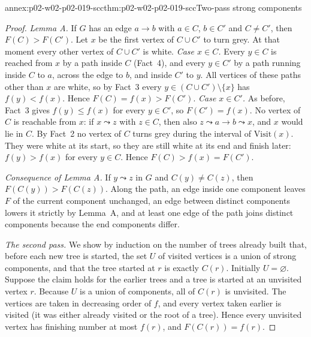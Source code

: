 \begin{annexitem}{annex:p02-w02-p02-019-scc}{thm:p02-w02-p02-019-scc}{Two-pass strong components}
\begin{proof}
\emph{Lemma A.}  If \(G\) has an edge \(a\to b\) with \(a\in C\),
\(b\in C'\) and \(C\neq C'\), then \(F(C)>F(C')\).  Let \(x\) be the first
vertex of \(C\cup C'\) to turn grey.  At that moment every other vertex of
\(C\cup C'\) is white.
\emph{Case \(x\in C\).}  Every \(y\in C\) is reached from \(x\) by a path
inside \(C\) (Fact~4), and every \(y\in C'\) by a path running inside \(C\) to
\(a\), across the edge to \(b\), and inside \(C'\) to \(y\).  All vertices of
these paths other than \(x\) are white, so by Fact~3 every
\(y\in(C\cup C')\setminus\{x\}\) has \(f(y)<f(x)\).  Hence
\(F(C)=f(x)>F(C')\).
\emph{Case \(x\in C'\).}  As before, Fact~3 gives \(f(y)\leq f(x)\) for every
\(y\in C'\), so \(F(C')=f(x)\).  No vertex of \(C\) is reachable from \(x\):
if \(x\leadsto z\) with \(z\in C\), then also \(z\leadsto a\to b\leadsto x\),
and \(x\) would lie in \(C\).  By Fact~2 no vertex of \(C\) turns grey during
the interval of \(\mathrm{Visit}(x)\).  They were white at its start, so they
are still white at its end and finish later: \(f(y)>f(x)\) for every
\(y\in C\).  Hence \(F(C)>f(x)=F(C')\).

\emph{Consequence of Lemma A.}  If \(y\leadsto z\) in \(G\) and
\(C(y)\neq C(z)\), then \(F(C(y))>F(C(z))\).  Along the path, an edge inside
one component leaves \(F\) of the current component unchanged, an edge between
distinct components lowers it strictly by Lemma~A, and at least one edge of the
path joins distinct components because the end components differ.

\emph{The second pass.}  We show by induction on the number of trees already
built that, before each new tree is started, the set \(U\) of visited
vertices is a union of strong components, and that the tree started at \(r\)
is exactly \(C(r)\).  Initially \(U=\varnothing\).  Suppose the claim holds
for the earlier trees and a tree is started at an unvisited vertex \(r\).
Because \(U\) is a union of components, all of \(C(r)\) is unvisited.  The
vertices are taken in decreasing order of \(f\), and every vertex taken
earlier is visited (it was either already visited or the root of a tree).
Hence every unvisited vertex has finishing number at most \(f(r)\), and
\(F(C(r))=f(r)\).


\end{proof}
\end{annexitem}
